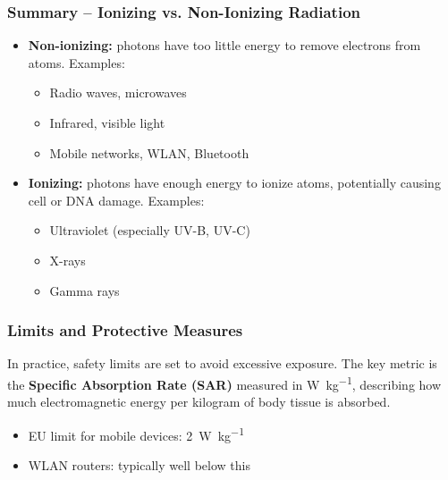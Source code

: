 \subsubsection{Summary – Ionizing vs. Non-Ionizing Radiation}
\vspace{1em}
\begin{tcolorbox}[physikbox,title=Ionizing and Non-Ionizing Radiation]
	\label{box:ionisierende}
	\begin{itemize}
		\item \textbf{Non-ionizing:} photons have too little energy to remove electrons from atoms. Examples:
		\begin{itemize}
			\item Radio waves, microwaves
			\item Infrared, visible light
			\item Mobile networks, WLAN, Bluetooth
		\end{itemize}
		\item \textbf{Ionizing:} photons have enough energy to ionize atoms, potentially causing cell or DNA damage. Examples:
		\begin{itemize}
			\item Ultraviolet (especially UV-B, UV-C)
			\item X-rays
			\item Gamma rays
		\end{itemize}
	\end{itemize}
\end{tcolorbox}
\vspace{1em}

\subsubsection{Limits and Protective Measures}

In practice, safety limits are set to avoid excessive exposure. The key metric is the \textbf{Specific Absorption Rate (SAR)} measured in \si{\watt\per\kilogram}, describing how much electromagnetic energy per kilogram of body tissue is absorbed.

\begin{itemize}
	\item EU limit for mobile devices: \SI{2}{\watt\per\kilogram}
	\item WLAN routers: typically well below this
\end{itemize}

